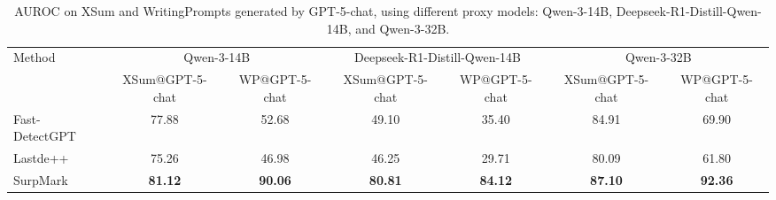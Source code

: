 \documentclass{article}
\theoremstyle{plain}
\theoremstyle{definition}
\theoremstyle{remark}
\begin{document}
\begin{table}[htbp]
\centering
\caption{AUROC on XSum and WritingPrompts generated by GPT-5-chat, using different proxy models: Qwen-3-14B, Deepseek-R1-Distill-Qwen-14B, and Qwen-3-32B.}
\label{tab:gpt5_proxy_models}
{\scriptsize
\begin{tabular}{lcc|cc|cc}
\toprule
\multirow{2}{*}{Method}
& \multicolumn{2}{c}{Qwen-3-14B}
& \multicolumn{2}{c}{Deepseek-R1-Distill-Qwen-14B}
& \multicolumn{2}{c}{Qwen-3-32B} \\
\cmidrule(lr){2-3}
\cmidrule(lr){4-5}
\cmidrule(lr){6-7}
& XSum@GPT-5-chat & WP@GPT-5-chat
& XSum@GPT-5-chat & WP@GPT-5-chat
& XSum@GPT-5-chat & WP@GPT-5-chat \\
\midrule
Fast-DetectGPT
& 77.88 & 52.68
& 49.10 & 35.40
& 84.91 & 69.90 \\

Lastde++
& 75.26 & 46.98
& 46.25 & 29.71
& 80.09 & 61.80 \\

SurpMark
& \textbf{81.12} & \textbf{90.06}
& \textbf{80.81} & \textbf{84.12}
& \textbf{87.10} & \textbf{92.36} \\
\bottomrule
\end{tabular}}
\end{table}
\end{document}
